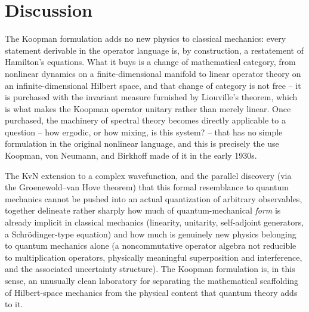 \documentclass[11pt]{article}
\theoremstyle{remark}
\begin{document}
\section{Discussion}
\label{sec:discussion}

The Koopman formulation adds no new physics to classical mechanics: every statement derivable in the operator language is, by construction, a restatement of Hamilton's equations. What it buys is a change of mathematical category, from nonlinear dynamics on a finite-dimensional manifold to linear operator theory on an infinite-dimensional Hilbert space, and that change of category is not free -- it is purchased with the invariant measure furnished by Liouville's theorem, which is what makes the Koopman operator unitary rather than merely linear. Once purchased, the machinery of spectral theory becomes directly applicable to a question -- how ergodic, or how mixing, is this system? -- that has no simple formulation in the original nonlinear language, and this is precisely the use Koopman, von Neumann, and Birkhoff made of it in the early 1930s.

The KvN extension to a complex wavefunction, and the parallel discovery (via the Groenewold--van Hove theorem) that this formal resemblance to quantum mechanics cannot be pushed into an actual quantization of arbitrary observables, together delineate rather sharply how much of quantum-mechanical \emph{form} is already implicit in classical mechanics (linearity, unitarity, self-adjoint generators, a Schr\"odinger-type equation) and how much is genuinely new physics belonging to quantum mechanics alone (a noncommutative operator algebra not reducible to multiplication operators, physically meaningful superposition and interference, and the associated uncertainty structure). The Koopman formulation is, in this sense, an unusually clean laboratory for separating the mathematical scaffolding of Hilbert-space mechanics from the physical content that quantum theory adds to it.
\end{document}
